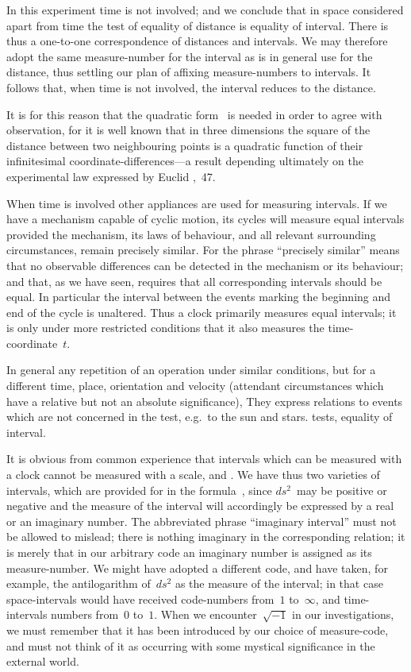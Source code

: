\documentclass[12pt]{book}
\begin{document}
In this experiment time is not involved; and we conclude that in space
considered apart from time the test of equality of distance is equality of
interval. There is thus a one-to-one correspondence of distances and intervals.
We may therefore adopt the same measure\hyp{}number for the interval as is in
general use for the distance, thus settling our plan of affixing measure\hyp{}numbers
to intervals. It follows that, when time is not involved, the interval
reduces to the distance.

It is for this reason that the quadratic form~ is needed in order to
agree with observation, for it is well known that in three dimensions the
square of the distance between two neighbouring points is a quadratic
function of their infinitesimal coordinate\hyp{}differences---a result depending
ultimately on the experimental law expressed by Euclid ,~47.

When time is involved other appliances are used for measuring intervals.
If we have a mechanism capable of cyclic motion, its cycles will measure
equal intervals provided the mechanism, its laws of behaviour, and all relevant
surrounding circumstances, remain precisely similar. For the phrase ``precisely
similar'' means that no observable differences can be detected in the mechanism
or its behaviour; and that, as we have seen, requires that all corresponding
intervals should be equal. In particular the interval between the events
marking the beginning and end of the cycle is unaltered. Thus a clock
primarily measures equal intervals; it is only under more restricted conditions
that it also measures the time\hyp{}coordinate~$t$.

In general any repetition of an operation under similar conditions, but for
a different time, place, orientation and velocity (attendant circumstances
which have a relative but not an absolute significance\footnotemark),\footnotetext
  {They express relations to events which are not concerned in the test, e.g.\ to the sun and
  stars.}
tests, equality of
interval.

It is obvious from common experience that intervals which can be
measured with a clock cannot be measured with a scale, and . We
have thus two varieties of intervals, which are provided for in the formula~,
since $ds^2$~may be positive or negative and the measure of the interval
will accordingly be expressed by a real or an imaginary number. The
%
abbreviated phrase ``imaginary interval'' must not be allowed to mislead;
there is nothing imaginary in the corresponding relation; it is merely that in
our arbitrary code an imaginary number is assigned as its measure\hyp{}number.
We might have adopted a different code, and have taken, for example, the
antilogarithm of~$ds^2$ as the measure of the interval; in that case space\hyp{}intervals
would have received code\hyp{}numbers from~$1$ to~$\infty$, and time\hyp{}intervals
numbers from~$0$ to~$1$. When we encounter~$\sqrt{-1}$ in our investigations, we
must remember that it has been introduced by our choice of measure\hyp{}code,
and must not think of it as occurring with some mystical significance in the
external world.
\end{document}
